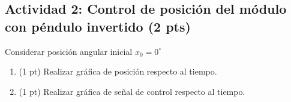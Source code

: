 \subsection{Actividad 2: Control de posición del módulo con péndulo invertido (2 pts)}
Considerar posición angular inicial $x_0 = 0^{\circ}$ 
\begin{enumerate}
	\item (1 pt) Realizar gráfica de posición respecto al tiempo.
	
	\item (1 pt) Realizar gráfica de señal de control respecto al tiempo.
\end{enumerate}